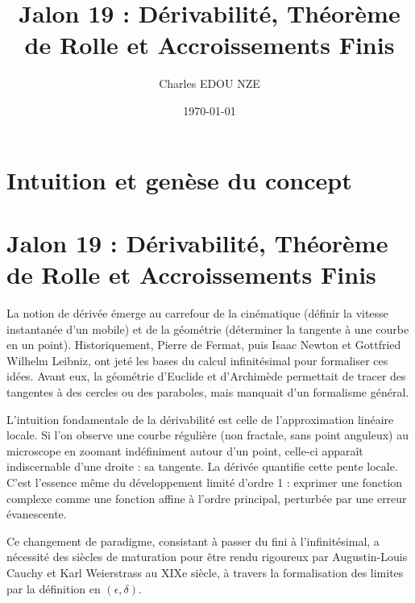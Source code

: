 \documentclass[11pt,a4paper]{article}
\title{Jalon 19 : Dérivabilité, Théorème de Rolle et Accroissements Finis}
\author{Charles EDOU NZE}
\date{\today}
\begin{document}
\maketitle
\tableofcontents
\newpage

\section{Intuition et genèse du concept}

\section*{Jalon 19 : Dérivabilité, Théorème de Rolle et Accroissements Finis}



La notion de dérivée émerge au carrefour de la cinématique (définir la vitesse instantanée d'un mobile) et de la géométrie (déterminer la tangente à une courbe en un point). Historiquement, Pierre de Fermat, puis Isaac Newton et Gottfried Wilhelm Leibniz, ont jeté les bases du calcul infinitésimal pour formaliser ces idées. Avant eux, la géométrie d'Euclide et d'Archimède permettait de tracer des tangentes à des cercles ou des paraboles, mais manquait d'un formalisme général.

L'intuition fondamentale de la dérivabilité est celle de l'approximation linéaire locale. Si l'on observe une courbe régulière (non fractale, sans point anguleux) au microscope en zoomant indéfiniment autour d'un point, celle-ci apparaît indiscernable d'une droite : sa tangente. La dérivée quantifie cette pente locale. C'est l'essence même du développement limité d'ordre 1 : exprimer une fonction complexe comme une fonction affine à l'ordre principal, perturbée par une erreur évanescente.

Ce changement de paradigme, consistant à passer du fini à l'infinitésimal, a nécessité des siècles de maturation pour être rendu rigoureux par Augustin-Louis Cauchy et Karl Weierstrass au XIXe siècle, à travers la formalisation des limites par la définition en $(\epsilon, \delta)$.
\end{document}

